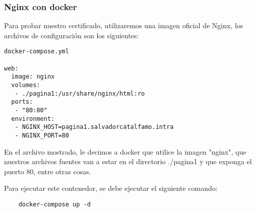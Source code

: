 \subsubsection*{Nginx con docker}

Para probar nuestro certificado, utilizaremos una imagen oficial de Nginx, los archivos de configuración
son los siguientes:


\begin{verbatim}
docker-compose.yml

web:
  image: nginx
  volumes:
   - ./pagina1:/usr/share/nginx/html:ro
  ports:
   - "80:80"
  environment:
   - NGINX_HOST=pagina1.salvadorcatalfamo.intra
   - NGINX_PORT=80
\end{verbatim}

En el archivo mostrado, le decimos a docker que utilice la imagen "nginx", que nuestros archivos fuentes
van a estar en el directorio ./pagina1 y que exponga el puerto 80, entre otras cosas.

\noindent Para ejecutar este contenedor, se debe ejecutar el siguiente comando:

\begin{verbatim}
    docker-compose up -d
\end{verbatim}


